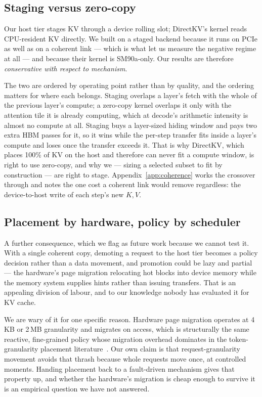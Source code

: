 \subsection{Staging versus zero-copy}
\label{sec:discussion:coherence}

Our host tier stages KV through a device rolling slot; DirectKV's kernel reads
CPU-resident KV directly. We built on a staged backend because it runs on PCIe
as well as on a coherent link --- which is what let us measure the negative
regime at all --- and because their kernel is SM90a-only. Our results are
therefore \emph{conservative with respect to mechanism}.

The two are ordered by operating point rather than by quality, and the ordering
matters for where each belongs. Staging overlaps a layer's fetch with the whole
of the previous layer's compute; a zero-copy kernel overlaps it only with the
attention tile it is already computing, which at decode's arithmetic intensity
is almost no compute at all. Staging buys a layer-sized hiding window and pays
two extra HBM passes for it, so it wins while the per-step transfer fits inside
a layer's compute and loses once the transfer exceeds it. That is why DirectKV,
which places 100\% of KV on the host and therefore can never fit a compute
window, is right to use zero-copy, and why we --- sizing a selected subset to fit
by construction --- are right to stage. Appendix~\ref{app:coherence} works the
crossover through and notes the one cost a coherent link would remove
regardless: the device-to-host write of each step's new $K,V$.

\subsection{Placement by hardware, policy by scheduler}

A further consequence, which we flag as future work because we cannot test it.
With a single coherent copy, demoting a request to the host tier becomes a
policy decision rather than a data movement, and promotion could be lazy and
partial --- the hardware's page migration relocating hot blocks into device
memory while the memory system supplies hints rather than issuing transfers.
That is an appealing division of labour, and to our knowledge nobody has
evaluated it for KV cache.

We are wary of it for one specific reason. Hardware page migration operates at
4\,KB or 2\,MB granularity and migrates on access, which is structurally the
same reactive, fine-grained policy whose migration overhead dominates in the
token-granularity placement literature~\cite{calkv}. Our own claim is that
request-granularity movement avoids that thrash because whole requests move
once, at controlled moments. Handing placement back to a fault-driven mechanism
gives that property up, and whether the hardware's migration is cheap enough to
survive it is an empirical question we have not answered.


